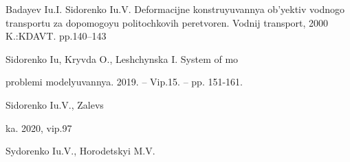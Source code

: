 \documentclass[12pt,a4paper]{article}
\begin{document}
\par
Badayev Iu.I. Sidorenko Iu.V. Deformacijne konstruyuvannya ob’yektiv vodnogo transportu za dopomogoyu politochkovih peretvoren. Vodnij transport, 2000 K.:KDAVT. pp.140–143
\par
Sidorenko Iu, Kryvda O., Leshchynska I. System of mo
\par
problemi modelyuvannya. 2019. – Vip.15. – pp. 151-161.
\par
Sidorenko Iu.V., Zalevs
\par
ka. 2020, vip.97
\par
Sydorenko Iu.V., Horodetskyi M.V.
\par
\end{document}
